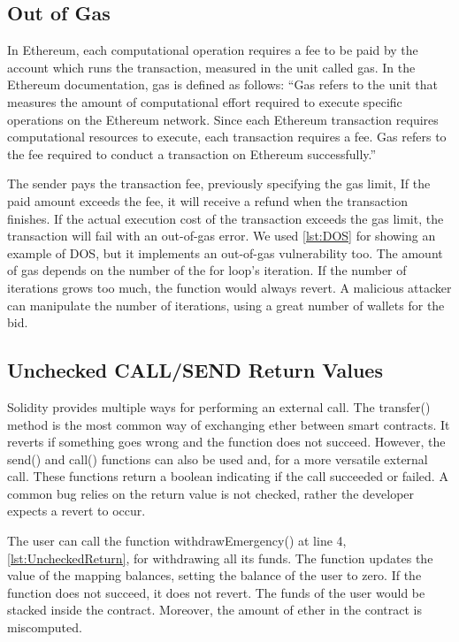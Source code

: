 \documentclass[a4paper,sigconf, language=french,
language=german, language=spanish, language=english]{acmart}
\begin{document}
\subsection{Out of Gas} 
In Ethereum, each computational operation requires a fee to be paid by the account which runs the transaction, measured in the unit called gas. 
In the Ethereum documentation, gas is defined as follows: “Gas refers to the unit that measures the amount of computational effort required to execute specific operations on the Ethereum network. 
Since each Ethereum transaction requires computational resources to execute, each transaction requires a fee. 
Gas refers to the fee required to conduct a transaction on Ethereum successfully.” 

The sender pays the transaction fee, previously specifying the gas limit, If the paid amount exceeds the fee, it will receive a refund when the transaction finishes. 
If the actual execution cost of the transaction exceeds the gas limit, the transaction will fail with an out-of-gas error. 
We used \autoref{lst:DOS} for showing an example of DOS, but it implements an out-of-gas vulnerability too. 
The amount of gas depends on the number of the for loop's iteration. If the number of iterations grows too much, the function would always revert. A malicious attacker can 
manipulate the number of iterations, using a great number of wallets for the bid.

\subsection{Unchecked CALL/SEND Return Values} 
Solidity provides multiple ways for performing an external call. 
The transfer() method is the most common way of exchanging ether between smart contracts. 
It reverts if something goes wrong and the function does not succeed. However, the send() and call() functions can also be used and, for a more versatile external call. 
These functions return a boolean indicating if the call succeeded or failed.  A common bug relies on the return value is not checked, rather the developer expects a revert to occur. 

The user can call the function withdrawEmergency()  at line 4, \autoref{lst:UncheckedReturn}, for withdrawing all its funds. The function updates the value of the mapping balances, setting 
the balance of the user to zero. If the function does not succeed, it does not revert. 
The funds of the user would be stacked inside the contract. Moreover, the amount of ether in the contract is miscomputed.
\end{document}
